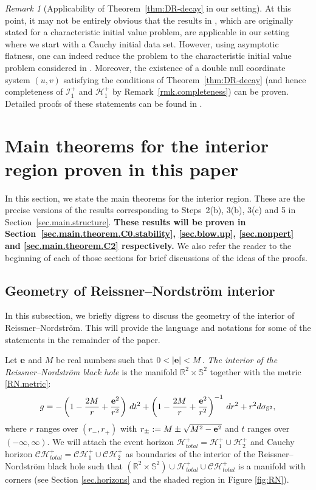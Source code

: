\documentclass[10pt, reqno]{amsart}
\theoremstyle{definition}
\theoremstyle{remark}
\newtheorem{remark}[theorem]{Remark}
\numberwithin{equation}{section}
\newcommand{\0}{\emptyset}
\newcommand{\calH}{\mathcal H}
\newcommand{\calI}{\mathcal I}
\newcommand{\f}{\frac}
\newcommand{\EH}{\calH^{+}}
\newcommand{\NI}{\calI^{+}}						%
\begin{document}
\begin{remark}[Applicability of Theorem~\ref{thm:DR-decay} in our setting]
At this point, it may not be entirely obvious that the results in \cite{DRPL}, which are originally stated for a characteristic initial value problem, are applicable in our setting where we start with a Cauchy initial data set. However, using asymptotic flatness, one can indeed reduce the problem to the characteristic initial value problem considered in \cite{DRPL}. Moreover, the existence of a double null coordinate system $(u, v)$ satisfying the conditions of Theorem~\ref{thm:DR-decay} (and hence completeness of $\NI_{1}$ and $\EH_{1}$ by Remark~\ref{rmk.completeness}) can be proven. Detailed proofs of these statements can be found in \cite[Section~5]{LO.exterior}. 
\end{remark}

\section{Main theorems for the interior region proven in this paper}\label{sec.precise}
In this section, we state the main theorems for the interior region. These are the precise versions of the results corresponding to Steps~2(b), 3(b), 3(c) and 5 in Section~\ref{sec.main.structure}. \textbf{These results will be proven in Section~\ref{sec.main.theorem.C0.stability}, \ref{sec.blow.up}, \ref{sec.nonpert} and \ref{sec.main.theorem.C2} respectively.} We also refer the reader to the beginning of each of those sections for brief discussions of the ideas of the proofs.

\subsection{Geometry of Reissner--Nordstr\"om interior} \label{sec.geometry}
In this subsection, we briefly digress to discuss the geometry of the interior of Reissner--Nordstr\"om. This will provide the language and notations for some of the statements in the remainder of the paper.

Let ${\bf e}$ and $M$ be real numbers such that $0<|{\bf e}|<M$. \emph{The interior of the Reissner--Nordstr\"om black hole} is the manifold $\mathbb R^2\times \mathbb S^2$ together with the metric \eqref{RN.metric}:
\begin{equation*}
g=- \left( 1-\f {2M} r+\f{{\bf e}^2}{r^2} \right) \,dt^2+ \left( 1-\f {2M} r+\f{{\bf e}^2}{r^2}\right)^{-1} \, dr^2+r^2 d\sigma_{\mathbb S^2},
\end{equation*}
where $r$ ranges over $(r_-,r_+)$ with $r_\pm:=M\pm\sqrt{M^2-{\bf e}^2}$ and $t$ ranges over $(-\infty,\infty)$. We will attach the event horizon $\mathcal H^+_{total} = \mathcal{H}^{+}_{1} \cup \mathcal{H}^{+}_{2}$ and Cauchy horizon $\mathcal{CH}^+_{total} = \mathcal{CH}^{+}_{1} \cup \mathcal{CH}^{+}_{2}$ as boundaries of the interior of the Reissner--Nordstr\"om black hole such that $(\mathbb R^2\times \mathbb S^2)\cup \mathcal{H}_{total}^{+} \cup \mathcal{CH}_{total}^{+}$ is a manifold with corners (see Section \ref{sec.horizons} and the shaded region in Figure \ref{fig:RN}).
\end{document}
